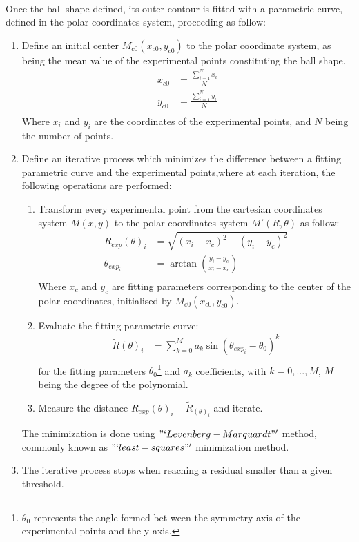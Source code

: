 \paragraph{}
Once the ball shape defined, its outer contour is fitted with a parametric curve, defined in the polar coordinates system, proceeding as follow:
\begin{enumerate}
	\item Define an initial center 	$M_{c0} (x_{c0},y_{c0})$	to the polar coordinate system, as being the mean value of the experimental points constituting the ball shape.
	\begin{align*}
			x_{c0} &= \frac{\sum\limits_{i=1}^N x_i}{N} \\
			y_{c0} &= \frac{\sum\limits_{i=1}^N y_i}{N} \\
	\end{align*}
	Where $x_i$ and $y_i$	are the coordinates of the experimental points, and	$N$	being the number of points.
	\item Define an iterative process which minimizes the difference between a fitting parametric curve and the experimental points,where at each iteration, the 		following operations are performed: 
	
		\begin{enumerate}[label=\alph*)]
			\item Transform every experimental point from the cartesian coordinates system  $M(x,y)$ to the polar coordinates system $M'(R,\theta)$  as follow:
				\begin{align*}
				R_{exp}(\theta)_i &=\sqrt{(x_i- x_c)^2+(y_i-y_c)^2}  \\
				\theta_{exp_i} &= \arctan(\frac{y_i-y_c}{x_i- x_c}) \\
				\end{align*}
				Where $x_c$ and $y_c$ are fitting parameters corresponding to the center of the polar coordinates, initialised by $M_{c0} (x_{c0},y_{c0})$.
			\item Evaluate the fitting parametric curve:
				\begin{align*}
					\tilde{R}(\theta)_i &=\sum\limits_{k=0}^M a_k \sin(\theta_{exp_i}-\theta_0)^k  \\
				\end{align*}
				for the fitting parameters $\theta_0$\footnote{$\theta_0$ represents the angle formed bet ween the symmetry axis of the experimental points and the y-axis.} 			 and $a_k$ coefficients, with $k={0,...,M}$, $M$ being the degree of the polynomial.
			\item Measure the distance $R_{exp}(\theta)_i-\tilde{R}_(\theta)_i$ and iterate.
		\end{enumerate}
	The minimization is done using $"`Levenberg-Marquardt"'$ method, commonly known as $"`least-squares"'$ minimization method.
	\item The iterative process stops when reaching a residual smaller than a given threshold.	
\end{enumerate}
